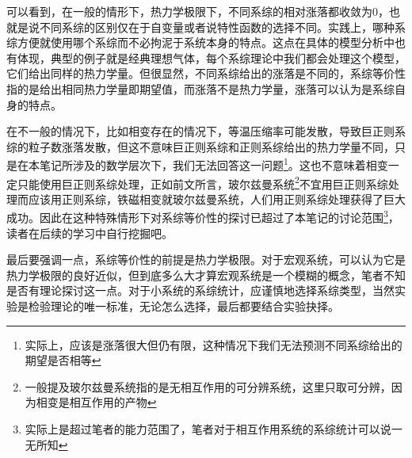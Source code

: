 \documentclass[../../main.tex]{subfiles}
\begin{document}
可以看到，在一般的情形下，热力学极限下，不同系综的相对涨落都收敛为0，也就是说不同系综的区别仅在于自变量或者说特性函数的选择不同。实践上，哪种系综方便就使用哪个系综而不必拘泥于系统本身的特点。这点在具体的模型分析中也有体现，典型的例子就是经典理想气体，每个系综理论中我们都会处理这个模型，它们给出同样的热力学量。但很显然，不同系综给出的涨落是不同的，系综等价性指的是给出相同热力学量即期望值，而涨落不是热力学量，涨落可以认为是系综自身的特点。

在不一般的情况下，比如相变存在的情况下，等温压缩率可能发散，导致巨正则系综的粒子数涨落发散，但这不意味巨正则系综和正则系综给出的热力学量不同，只是在本笔记所涉及的数学层次下，我们无法回答这一问题\footnote{实际上，应该是涨落很大但仍有限，这种情况下我们无法预测不同系综给出的期望是否相等}。这也不意味着相变一定只能使用巨正则系综处理，正如前文所言，玻尔兹曼系统\footnote{一般提及玻尔兹曼系统指的是无相互作用的可分辨系统，这里只取可分辨，因为相变是相互作用的产物}不宜用巨正则系综处理而应该用正则系综，铁磁相变就玻尔兹曼系统，人们用正则系综处理获得了巨大成功。因此在这种特殊情形下对系综等价性的探讨已超过了本笔记的讨论范围\footnote{实际上是超过笔者的能力范围了，笔者对于相互作用系统的系综统计可以说一无所知}，读者在后续的学习中自行挖掘吧。

最后要强调一点，系综等价性的前提是热力学极限。对于宏观系统，可以认为它是热力学极限的良好近似，但到底多么大才算宏观系统是一个模糊的概念，笔者不知是否有理论探讨这一点。对于小系统的系综统计，应谨慎地选择系综类型，当然实验是检验理论的唯一标准，无论怎么选择，最后都要结合实验抉择。
\end{document}
